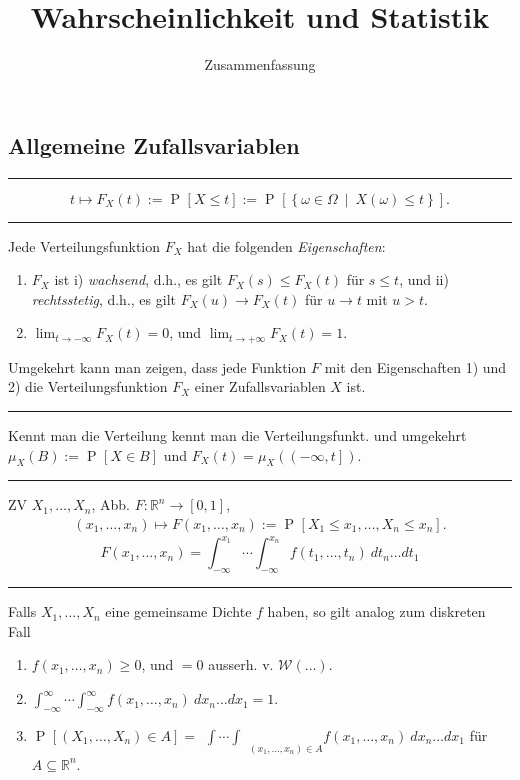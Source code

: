 \documentclass[a4paper, 12pt]{extarticle}
\title{Wahrscheinlichkeit und Statistik}
\author{Zusammenfassung}
\date{}
\newcommand{\sep}{\vspace{5pt}\noindent\hrule\vspace{5pt}}
\newcommand{\R}{\mathbb{R}}
\newcommand{\cW}{\mathcal{W}}
\newcommand{\dset}[2]{\left\{ #1 \ \middle| \ #2 \right\}}
\newcommand{\Prob}[2][]{\operatorname{P}_{#1}\left[ #2 \right]}
\begin{document}


\begin{multicols*}{2}
\raggedcolumns

\section{Allgemeine Zufallsvariablen}

\sep

\Def[Verteilungsfunktion]
\[
t\mapsto F_X(t):=\Prob{X\leq t}:=\Prob{\dset{\omega\in\Omega}{X(\omega)\leq t}}.
\]

\sep

Jede Verteilungsfunktion $F_X$ hat die folgenden \emph{Eigenschaften}:
\begin{enumerate}[label=\arabic*)]
  \item $F_X$ ist i) \emph{wachsend}, d.h., es gilt $F_X(s)\leq F_X(t)$ für
  $s\leq t$, und ii) \emph{rechtsstetig}, d.h., es gilt $F_X(u)\to F_X(t)$ für
    $u\to t$ mit $u>t$.
  \item $\displaystyle \lim_{t\to - \infty}F_X(t)=0$, und
  $\displaystyle \lim_{t\to + \infty}F_X(t)=1$.
\end{enumerate}
Umgekehrt kann man zeigen, dass jede Funktion $F$ mit den Eigenschaften 1) und
2) die Verteilungsfunktion $F_X$ einer Zufallsvariablen $X$ ist.

\sep

Kennt man die Verteilung kennt man die Verteilungsfunkt. und umgekehrt
$\mu_X(B):=\Prob{X\in B}$ und $F_X(t)=\mu_X\left(\left(-\infty,
t\right]\right)$.

\sep


ZV $X_1,\ldots,X_n$, Abb. $F\colon\R^n\to[0,1]$,
\begin{gather*}
(x_1,\ldots,x_n)\mapsto F(x_1,\ldots,x_n):=\Prob{X_1\leq x_1, \ldots, X_n\leq
x_n}.
\end{gather*}
\[
F(x_1,\ldots,x_n)=\int_{-\infty}^{x_1}\cdots\int_{-\infty}^{x_n}
f(t_1,\ldots,t_n) \ dt_n \ldots dt_1
\]

\sep

Falls $X_1,\ldots,X_n$ eine gemeinsame Dichte $f$ haben, so gilt analog zum
diskreten Fall
\begin{enumerate}[label=\roman*)]
  \item $f(x_1,\ldots,x_n)\geq 0$, und $=0$ ausserh. v.
  $\cW(\ldots)$.
  \item $\int_{-\infty}^\infty\cdots\int_{-\infty}^{\infty} f(x_1,\ldots,x_n) \
  dx_n \ldots dx_1=1.$
  \item $\Prob{(X_1,\ldots,X_n)\in
  A}=\substack{\int\cdots\int}_{(x_1,\ldots,x_n)\in A}f(x_1,\ldots,x_n) \
  dx_n\ldots dx_1$ für $A\subseteq \R^n$.
\end{enumerate}


\end{multicols*}
\end{document}
